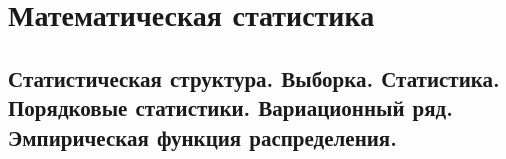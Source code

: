 \documentclass[oneside,final,14pt]{extreport}
\begin{document}
\chapter{Математическая статистика}
\section{Статистическая структура. Выборка. Статистика. Порядковые статистики. Вариационный ряд. Эмпирическая функция распределения.}
\end{document}
